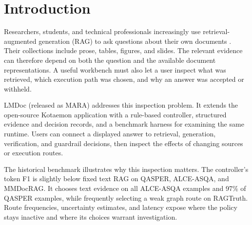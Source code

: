 \begin{abstract}
LMDoc is a local-first document-QA workbench that records which evidence was retrieved, which route was selected, and why an answer was returned or withheld. Built on Kotaemon, it helps researchers and technical users inspect answer stages, change sources or routes, and test suspected failure causes through Web, command-line, and diagnostic workflows. Two forms of evidence illustrate this use. A historical benchmark bundle spanning six datasets exposes routing failures and trade-offs, with no consistent F1 advantage over fixed text retrieval. Two case studies connect recorded decisions to interventions: replaying the same recorded claims tests a targeted verifier repair, and a public-chart comparison examines the effect of including image evidence. We release the Apache-2.0 implementation, captured case inputs and outputs, reproduction scripts, and a demonstration of the document-QA interface.
\end{abstract}

\section{Introduction}
Researchers, students, and technical professionals increasingly use retrieval-augmented generation (RAG) to ask questions about their own documents \citep{lewis2020rag}. Their collections include prose, tables, figures, and slides. The relevant evidence can therefore depend on both the question and the available document representations. A useful workbench must also let a user inspect what was retrieved, which execution path was chosen, and why an answer was accepted or withheld.

LMDoc (released as MARA) addresses this inspection problem. It extends the open-source Kotaemon application \citep{kotaemon} with a rule-based controller, structured evidence and decision records, and a benchmark harness for examining the same runtime. Users can connect a displayed answer to retrieval, generation, verification, and guardrail decisions, then inspect the effects of changing sources or execution routes.

The historical benchmark illustrates why this inspection matters. The controller's token F1 is slightly below fixed text RAG on QASPER, ALCE-ASQA, and MMDocRAG. It chooses text evidence on all ALCE-ASQA examples and 97\% of QASPER examples, while frequently selecting a weak graph route on RAGTruth. Route frequencies, uncertainty estimates, and latency expose where the policy stays inactive and where its choices warrant investigation.

